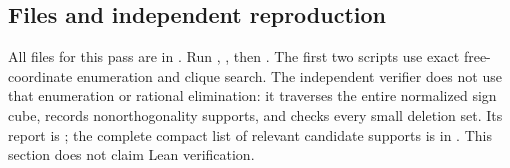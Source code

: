 \subsection{Files and independent reproduction}
All files for this pass are in .
Run , , then .
The first two scripts use exact free-coordinate enumeration and clique
search. The independent verifier does not use that enumeration or
rational elimination: it traverses the entire normalized sign cube,
records nonorthogonality supports, and checks every small deletion set.
Its report is ; the complete compact list of
relevant candidate supports is in .
This section does not claim Lean verification.

